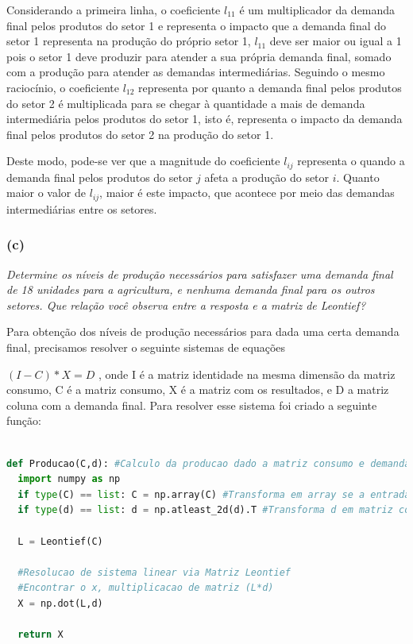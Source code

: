 \documentclass[a4paper, 12pt]{article}
\begin{document}
Considerando a primeira linha, o coeficiente $l_{11}$ é um multiplicador da demanda final pelos produtos do setor 1 e representa o impacto que a demanda final do setor 1 representa na produção do próprio setor 1, $l_{11}$ deve ser maior ou igual a 1 pois o setor 1 deve produzir para atender a sua própria demanda final, somado com a produção para atender as demandas intermediárias. Seguindo o mesmo raciocínio, o coeficiente $l_{12}$ representa por quanto a demanda final pelos produtos do setor 2 é multiplicada para se chegar à quantidade a mais de demanda intermediária pelos produtos do setor 1, isto é, representa o impacto da demanda final pelos produtos do setor 2 na produção do setor 1.

Deste modo, pode-se ver que a magnitude do coeficiente $l_{ij}$ representa o quando a demanda final pelos produtos do setor $j$ afeta a produção do setor $i$. Quanto maior o valor de $l_{ij}$, maior é este impacto, que acontece por meio das demandas intermediárias entre os setores.


\subsubsection{(c)}
\textit {Determine os níveis de produção necessários para satisfazer uma demanda final de 18 unidades para a agricultura, e nenhuma demanda final para os outros setores. Que relação você observa entre a resposta e a matriz de Leontief?}

Para obtenção dos níveis de produção necessários para dada uma certa demanda final, precisamos resolver o seguinte sistemas de equações 

$(I - C)*X = D$ , onde I é a matriz identidade na mesma dimensão da matriz consumo, C é a matriz consumo, X é a matriz com os resultados, e D a matriz coluna com a demanda final. Para resolver esse sistema foi criado a seguinte função:


\begin{lstlisting}[language=Python, caption=Função Calculo da Produção, label=listing_Producao]

def Producao(C,d): #Calculo da producao dado a matriz consumo e demanda
  import numpy as np
  if type(C) == list: C = np.array(C) #Transforma em array se a entrada for lista
  if type(d) == list: d = np.atleast_2d(d).T #Transforma d em matriz coluna se for lista
 
  L = Leontief(C)
  
  #Resolucao de sistema linear via Matriz Leontief
  #Encontrar o x, multiplicacao de matriz (L*d)
  X = np.dot(L,d)

  return X
  
 \end{lstlisting}
\end{document}
